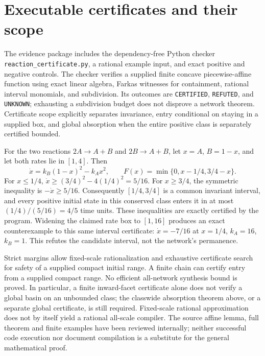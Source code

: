 \documentclass[11pt]{article}
\theoremstyle{definition}
\theoremstyle{remark}
\numberwithin{equation}{section}
\begin{document}
\appendix
\section{Executable certificates and their scope}
The evidence package includes the dependency-free Python checker
\texttt{reaction\_certificate.py}, a rational example input, and exact
positive and negative controls. The checker verifies a supplied finite
concave piecewise-affine function using exact linear algebra, Farkas
witnesses for containment, rational interval monomials, and subdivision.
Its outcomes are \texttt{CERTIFIED}, \texttt{REFUTED}, and
\texttt{UNKNOWN}; exhausting a subdivision budget does not disprove a
network theorem. Certificate scope explicitly separates invariance,
entry conditional on staying in a supplied box, and global absorption
when the entire positive class is separately certified bounded.

For the two reactions $2A\to A+B$ and $2B\to A+B$, let $x=A$,
$B=1-x$, and let both rates lie in $[1,4]$. Then
\[
 \dot x=k_B(1-x)^2-k_Ax^2,\qquad
 F(x)=\min\{0,x-1/4,3/4-x\}.
\]
For $x\le1/4$, $\dot x\ge(3/4)^2-4(1/4)^2=5/16$.
For $x\ge3/4$, the symmetric inequality is $-\dot x\ge5/16$.
Consequently $[1/4,3/4]$ is a common invariant interval, and every
positive initial state in this conserved class enters it in at most
$(1/4)/(5/16)=4/5$ time units. These inequalities are exactly certified
by the program. Widening the claimed rate box to $[1,16]$ produces
an exact counterexample to this same interval certificate:
$\dot x=-7/16$ at $x=1/4$, $k_A=16$, $k_B=1$.
This refutes the candidate interval, not the network's permanence.

Strict margins allow fixed-scale rationalization and exhaustive
certificate search for safety of a supplied compact initial range.
A finite chain can certify entry from a supplied compact range.
No efficient all-network synthesis bound is proved. In particular,
a finite inward-facet certificate alone does not verify a global basin
on an unbounded class; the classwide absorption theorem above, or a
separate global certificate, is still required. Fixed-scale rational
approximation does not by itself yield a rational all-scale compiler.
The source affine lemma, full theorem and finite examples have been
reviewed internally; neither successful code execution nor document
compilation is a substitute for the general mathematical proof.

\end{document}
